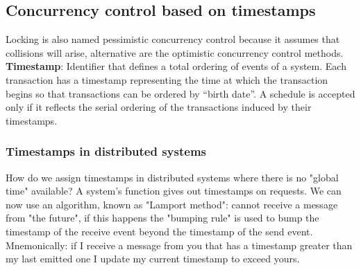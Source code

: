 \subsection{Concurrency control based on timestamps}
Locking is also named pessimistic concurrency control because it assumes that collisions will arise, alternative are the optimistic concurrency control methods.\newline
\newline
\textbf{Timestamp}: Identifier that defines a total ordering of events of a system.\newline
\newline
Each transaction has a timestamp representing the time
at which the transaction begins so that transactions can
be ordered by “birth date”.\newline
A schedule is accepted only if it reflects the serial
ordering of the transactions induced by their timestamps.
\subsubsection{Timestamps in distributed systems}
How do we assign timestamps in distributed systems where there is no "global time" available? A system’s function gives out timestamps on requests.\newline
We can now use an algorithm, known as "Lamport method": cannot receive a message from "the
future", if this happens the "bumping rule" is used to bump the
timestamp of the receive event beyond the timestamp of the send
event.\newline
\newline
Mnemonically: if I receive a message from you that has a
timestamp greater than my last emitted one I update my current
timestamp to exceed yours.
